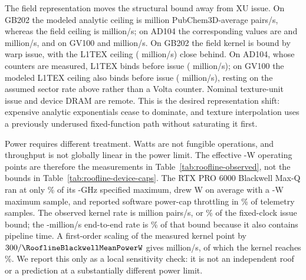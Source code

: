 The field representation moves the structural bound away from XU issue. On GB202 the modeled analytic ceiling is
\RooflineBlackwellAnalyticStructuralMillionPairsPerSecond{} million PubChem3D-average
pairs/s, whereas the field ceiling is
\RooflineBlackwellFieldStructuralMillionPairsPerSecond{} million/s; on AD104
the corresponding values are
\RooflineLFourAnalyticStructuralMillionPairsPerSecond{} and
\RooflineLFourFieldLoneTexMillionPairsPerSecond{} million/s, and on GV100
\RooflineTitanAnalyticStructuralMillionPairsPerSecond{} and
\RooflineTitanFieldStructuralMillionPairsPerSecond{} million/s. On GB202 the field
kernel is bound by warp issue, with the L1TEX ceiling
(\RooflineBlackwellFieldLoneTexMillionPairsPerSecond{} million/s) close behind. On
AD104, whose counters are measured, L1TEX binds before issue
(\RooflineLFourFieldIssueMillionPairsPerSecond{} million/s); on GV100 the modeled
L1TEX ceiling also binds before issue
(\RooflineTitanFieldIssueMillionPairsPerSecond{} million/s), resting on the
assumed sector rate above rather than a Volta counter. Nominal texture-unit
issue and device DRAM are remote. This is the desired representation shift:
expensive analytic exponentials cease to dominate, and texture interpolation
uses a previously underused fixed-function path without saturating it first.







Power requires different treatment. Watts are not fungible operations, and
throughput is not globally linear in the power limit. The effective \RooflineBlackwellPowerLimitW-W
operating points are therefore the measurements in
Table~\ref{tab:roofline-observed}, not the bounds in
Table~\ref{tab:roofline-device-caps}. The RTX PRO 6000 Blackwell Max-Q ran at only
\RooflineBlackwellClockFractionPercent\% of its \RooflineBlackwellSpecifiedMaxClockGHz-GHz specified maximum,
drew \RooflineBlackwellMeanPowerW{} W on average with a
\RooflineBlackwellMaximumPowerW{}-W maximum sample, and reported software
power-cap throttling in \RooflineBlackwellPowerCapPercent\% of telemetry
samples. The observed kernel rate is
\RooflineBlackwellKernelMillionPairsPerSecond{} million pairs/s, or
\RooflineBlackwellKernelToStructuralPercent\% of the fixed-clock issue bound;
the \DfiveMillionEvaluationsPerSecond{}-million/s end-to-end rate is
\RooflineBlackwellWallToStructuralPercent\% of that bound because it also
contains pipeline time. A first-order scaling of the measured kernel point by
$300/\RooflineBlackwellMeanPowerW$ gives
\RooflineBlackwellLocalPowerExtrapolatedMillionPairsPerSecond{} million/s, of
which the kernel reaches \RooflineBlackwellKernelToPowerExtrapolatedPercent\%.
We report this only as a local sensitivity check: it is not an independent
roof or a prediction at a substantially different power limit.

